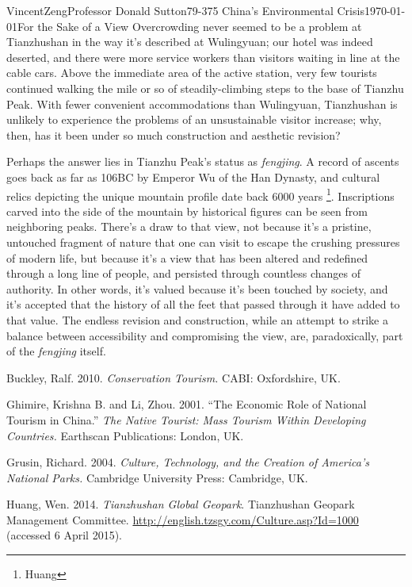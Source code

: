 \documentclass[12pt]{article}
\begin{document}
\begin{mla}{Vincent}{Zeng}{Professor Donald Sutton}{79-375 China's Environmental Crisis}{\today}{For the Sake of a View}
Overcrowding never seemed to be a problem at Tianzhushan in the way it's
described at Wulingyuan; our hotel was indeed deserted, and there were more
service workers than visitors waiting in line at the cable cars. Above the
immediate area of the active station, very few tourists continued walking the
mile or so of steadily-climbing steps to the base of Tianzhu Peak. With fewer
convenient accommodations than Wulingyuan, Tianzhushan is unlikely to experience
the problems of an unsustainable visitor increase; why, then, has it been under
so much construction and aesthetic revision?

Perhaps the answer lies in Tianzhu Peak's status as \textit{fengjing}. A record
of ascents goes back as far as 106BC by Emperor Wu of the Han Dynasty, and
cultural relics depicting the unique mountain profile date back 6000 years
\footnote{Huang}. Inscriptions carved into the side of the mountain by
historical figures can be seen from neighboring peaks. There's a draw to that
view, not because it's a pristine, untouched fragment of nature that one can
visit to escape the crushing pressures of modern life, but because it's a view
that has been altered and redefined through a long line of people,
and persisted through countless changes of authority. In other words, it's
valued because it's been touched by society, and it's accepted that the history
of all the feet that passed through it have added to that value. The endless
revision and construction, while an attempt to strike a balance between
accessibility and compromising the view, are, paradoxically, part of the
\textit{fengjing} itself.

\begin{workscited}
\bibent
Buckley, Ralf. 2010. \textit{Conservation Tourism.} CABI: Oxfordshire, UK.


\bibent
Ghimire, Krishna B. and Li, Zhou. 2001. ``The Economic Role of National Tourism in China.'' \textit{The Native Tourist: Mass Tourism Within Developing Countries.} Earthscan Publications: London, UK.

\bibent
Grusin, Richard. 2004. \textit{Culture, Technology, and the Creation of America's National Parks.} Cambridge University Press: Cambridge, UK.

\bibent
Huang, Wen. 2014. \textit{Tianzhushan Global Geopark}. Tianzhushan Geopark Management Committee. \url{http://english.tzsgy.com/Culture.asp?Id=1000} (accessed 6 April 2015).


\end{workscited}
\end{mla}
\end{document}
